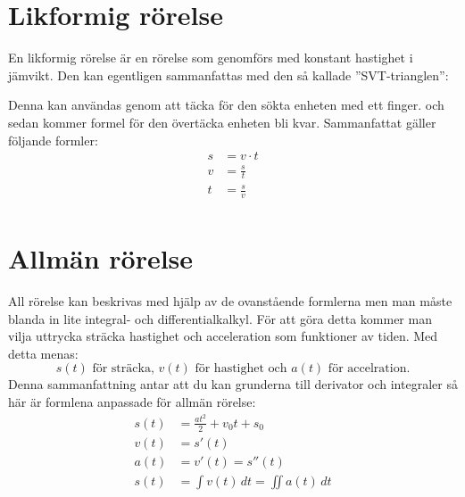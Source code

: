 \section{Likformig rörelse}
En likformig rörelse är en rörelse som genomförs med konstant hastighet i jämvikt. Den kan egentligen sammanfattas med den så kallade ''SVT-trianglen'':
\begin{figure*}[h]
    \centering
\end{figure*}

Denna kan användas genom att täcka för den sökta enheten med ett finger. och sedan kommer formel för den övertäcka enheten bli kvar. Sammanfattat gäller följande formler:
\begin{align*}
    s &= v \cdot t \\
    v &= \frac{s}{t} \\
    t &= \frac{s}{v} \\
\end{align*}

\section{Allmän rörelse}
All rörelse kan beskrivas med hjälp av de ovanstående formlerna men man måste blanda in lite integral- och differentialkalkyl. För att göra detta kommer man vilja uttrycka sträcka hastighet och acceleration som funktioner av tiden. Med detta menas:
\begin{equation*}
    s(t) \text{ för sträcka, } v(t) \text{ för hastighet och } a(t) \text{ för accelration.}
\end{equation*}
Denna sammanfattning antar att du kan grunderna till derivator och integraler så här är formlena anpassade för allmän rörelse:
\begin{align*}
    s(t) &= \frac{at^2}{2} + v_0t + s_0 \\
    v(t) &= s'(t) \\
    a(t) &= v'(t) = s''(t) \\[15pt]
    s(t) &=  \int{v(t)}\, dt = \iint{a(t)}\, dt
\end{align*}